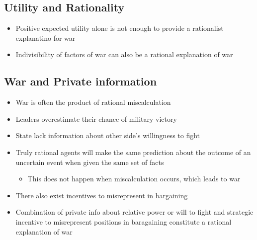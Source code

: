 \documentclass[11pt]{article}
\begin{document}
\subsection{Utility and Rationality}
\label{sec:org2c9e6a1}
\begin{itemize}
\item Positive expected utility alone is not enough to provide a rationalist explanatino for war
\item Indivisibility of factors of war can also be a rational explanation of war
\end{itemize}
\subsection{War and Private information}
\label{sec:org7055181}
\begin{itemize}
\item War is often the product of rational miscalculation
\item Leaders overestimate their chance of military victory
\item State lack information about other side's willingness to fight
\item Truly rational agents will make the same prediction about the outcome of an uncertain event when given the same set of facts
\begin{itemize}
\item This does not happen when miscalculation occurs, which leads to war
\end{itemize}
\item There also exist incentives to misrepresent in bargaining
\item Combination of private info about relative power or will to fight and strategic incentive to misrepresent positions in baragaining constitute a rational explanation of war
\end{itemize}
\end{document}
